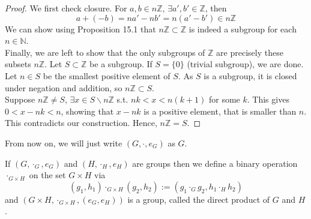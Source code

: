 \documentclass[a4paper]{article}
\begin{document}
\begin{proof}
We first check closure. For $a,b\in n\mathbb{Z}$, $\exists a',b'\in\mathbb{Z}$, then
$$a+(-b)=na'-nb'=n(a'-b')\in n\mathbb{Z}$$
We can show using Proposition 15.1 that
$n\mathbb{Z}\subset\mathbb{Z}$ is indeed a subgroup for each $n\in\mathbb{N}$.\\[5pt]
Finally, we are left to show that the only subgroups of $\mathbb{Z}$ are precisely these subsets $n\mathbb{Z}$. Let $S\subset\mathbb{Z}$ be a subgroup. If $S=\{0\}$ (trivial subgroup), we are done. Let $n\in S$ be the smallest positive element of $S$. As $S$ is a subgroup, it is closed under negation and addition, so $n\mathbb{Z}\subset S$.\\[5pt]
Suppose $n\mathbb{Z}\neq S$, $\exists x\in S\backslash n\mathbb{Z}$ s.t. $nk<x<n(k+1)$ for some $k$. This gives $0<x-nk<n$, showing that $x-nk$ is a positive element, that is smaller than $n$. This contradicts our construction. Hence, $n\mathbb{Z}=S$.
\end{proof}
From now on, we will just write $(G,\cdot, e_G)$ as $G$.
\begin{defi}
If $(G,\cdot_G,e_G)$ and $(H,\cdot_H,e_H)$ are groups then we define a binary operation $\cdot_{G\times H}$ on the set $G\times H$ via
$$(g_1,h_1)\cdot_{G\times H}(g_2,h_2):=(g_1\cdot_Gg_2,h_1\cdot_Hh_2)$$
and $(G\times H,\cdot_{G\times H},(e_G,e_H))$ is a group, called the direct product of $G$ and $H$.
\end{defi}
\end{document}
